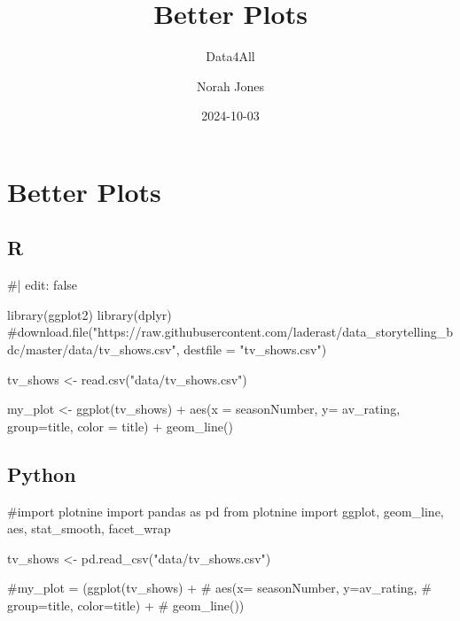 \documentclass[
  letterpaper,
  DIV=11,
  numbers=noendperiod]{scrreprt}
\title{Better Plots}
\subtitle{Data4All}
\author{Norah Jones}
\date{2024-10-03}
\newenvironment{Shaded}{\begin{snugshade}}{\end{snugshade}}
\newcommand{\NormalTok}[1]{\textcolor[rgb]{0.00,0.23,0.31}{#1}}
\renewcommand*\contentsname{Table of contents}
\newcommand\contentsname{Table of contents}
\begin{document}
\maketitle

\renewcommand*\contentsname{Table of contents}
{
\hypersetup{linkcolor=}
\setcounter{tocdepth}{2}
\tableofcontents
}


\chapter*{Better Plots}\label{better-plots}


\section{R}

\begin{Shaded}
\begin{Highlighting}[]
\NormalTok{\#| edit: false}

\NormalTok{library(ggplot2)}
\NormalTok{library(dplyr)}
\NormalTok{\#download.file("https://raw.githubusercontent.com/laderast/data\_storytelling\_bdc/master/data/tv\_shows.csv", destfile = "tv\_shows.csv")}

\NormalTok{tv\_shows \textless{}{-} read.csv("data/tv\_shows.csv")}

\NormalTok{my\_plot \textless{}{-} }
\NormalTok{  ggplot(tv\_shows) + }
\NormalTok{  aes(x = seasonNumber, y= av\_rating, group=title, }
\NormalTok{      color = title) + }
\NormalTok{  geom\_line()}
\end{Highlighting}
\end{Shaded}

\section{Python}

\begin{Shaded}
\begin{Highlighting}[]
\NormalTok{\#import plotnine}
\NormalTok{import pandas as pd}
\NormalTok{from plotnine import ggplot, geom\_line, aes, stat\_smooth, facet\_wrap}

\NormalTok{tv\_shows \textless{}{-} pd.read\_csv("data/tv\_shows.csv")}

\NormalTok{\#my\_plot = (ggplot(tv\_shows) + }
\NormalTok{\#             aes(x= seasonNumber, y=av\_rating,}
\NormalTok{\#                 group=title, color=title) +}
\NormalTok{\#             geom\_line())}
\end{Highlighting}
\end{Shaded}
\end{document}
